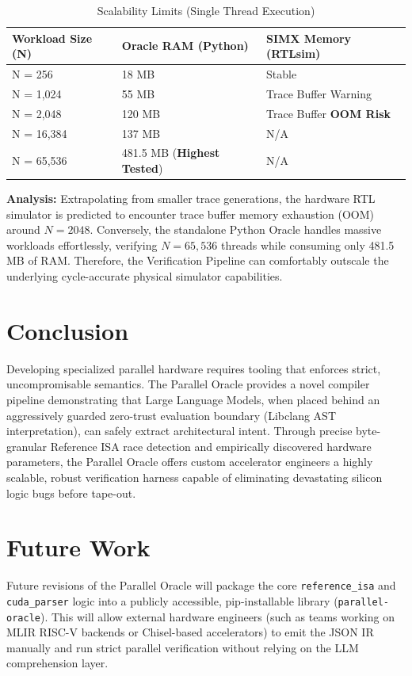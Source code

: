 \documentclass[10pt, conference, compsocconf]{IEEEtran}
\begin{document}
\begin{table}[H]
\centering
\caption{Scalability Limits (Single Thread Execution)}
\begin{tabular}{@{}lll@{}}
\toprule
\textbf{Workload Size (N)} & \textbf{Oracle RAM (Python)} & \textbf{SIMX Memory (RTLsim)} \\ \midrule
N = 256                    & 18 MB                        & Stable                 \\
N = 1,024                  & 55 MB                        & Trace Buffer Warning   \\
N = 2,048                  & 120 MB                       & Trace Buffer \textbf{OOM Risk} \\
N = 16,384                 & 137 MB                & N/A                    \\
N = 65,536                 & 481.5 MB (\textbf{Highest Tested}) & N/A                    \\ \bottomrule
\end{tabular}
\end{table}

\textbf{Analysis:} Extrapolating from smaller trace generations, the hardware RTL simulator is predicted to encounter trace buffer memory exhaustion (OOM) around $N=2048$. Conversely, the standalone Python Oracle handles massive workloads effortlessly, verifying $N=65,536$ threads while consuming only 481.5 MB of RAM. Therefore, the Verification Pipeline can comfortably outscale the underlying cycle-accurate physical simulator capabilities.

\section{Conclusion}
Developing specialized parallel hardware requires tooling that enforces strict, uncompromisable semantics. The Parallel Oracle provides a novel compiler pipeline demonstrating that Large Language Models, when placed behind an aggressively guarded zero-trust evaluation boundary (Libclang AST interpretation), can safely extract architectural intent. Through precise byte-granular Reference ISA race detection and empirically discovered hardware parameters, the Parallel Oracle offers custom accelerator engineers a highly scalable, robust verification harness capable of eliminating devastating silicon logic bugs before tape-out.

\section{Future Work}
Future revisions of the Parallel Oracle will package the core \texttt{reference\_isa} and \texttt{cuda\_parser} logic into a publicly accessible, pip-installable library (\texttt{parallel-oracle}). This will allow external hardware engineers (such as teams working on MLIR RISC-V backends or Chisel-based accelerators) to emit the JSON IR manually and run strict parallel verification without relying on the LLM comprehension layer.
\end{document}
